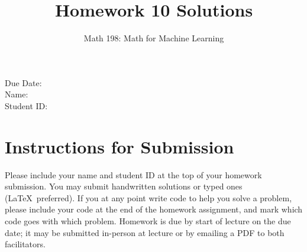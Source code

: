 \documentclass{article}
\title{Homework 10 Solutions}
\author{Math 198: Math for Machine Learning}
\date{}
\begin{document}
\maketitle

\noindent
Due Date:  \\
Name: \\
Student ID:

\section*{Instructions for Submission}
Please include your name and student ID at the top of your homework submission. You may submit handwritten solutions or typed ones (\LaTeX\ preferred). If you at any point write code to help you solve a problem, please include your code at the end of the homework assignment, and mark which code goes with which problem. Homework is due by start of lecture on the due date; it may be submitted in-person at lecture or by emailing a PDF to both facilitators.
\end{document}
